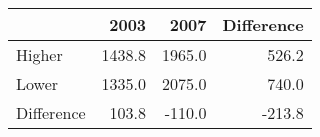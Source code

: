 \begin{tabular}{lrrr}
\toprule
{} &    2003 &    2007 &  Difference \\
\midrule
Higher     &  1438.8 &  1965.0 &       526.2 \\
Lower      &  1335.0 &  2075.0 &       740.0 \\
Difference &   103.8 &  -110.0 &      -213.8 \\
\bottomrule
\end{tabular}
